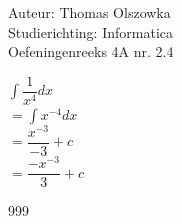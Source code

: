 \documentclass[a4paper]{article}
\newcommand{\dint}{\displaystyle\int}
\begin{document}
\noindent \large Auteur: Thomas Olszowka \\
\noindent \large Studierichting: Informatica \\
\noindent \large Oefeningenreeks 4A nr. 2.4  \\



\medskip

\normalsize

$\dint \dfrac{1}{x^4} dx$ \\

$= \dint x^{-4} dx $ \\

$= \dfrac{x^{-3}}{-3} + c$ \\

$= \dfrac{-x^{-3}}{3} + c$ \\

\begin{thebibliography}{999}
\end{thebibliography}
\end{document}
